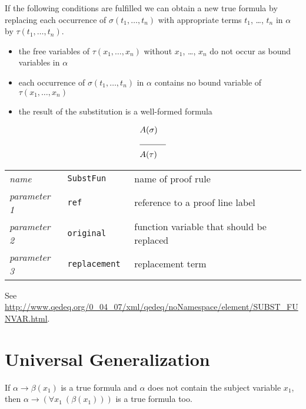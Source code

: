 \documentclass[a4paper,german,10pt,twoside]{book}
\theoremstyle{definition}
\theoremstyle{remark}
\begin{document}
If the following conditions are fulfilled we can obtain a new true formula by replacing each occurrence of $\sigma(t_1, \ldots, t_n)$ with appropriate terms $t_1$, \ldots, $t_n$ in $\alpha$ by $\tau(t_1, \ldots, t_n)$.

\begin{itemize}

\item 
the free variables of $\tau(x_1, \ldots, x_n)$ without $x_1$, \ldots, $x_n$ do not occur as bound variables in $\alpha$

\item
each occurrence of $\sigma(t_1, \ldots, t_n)$ in $\alpha$ contains no bound variable of $\tau(x_1, \ldots, x_n)$

\item
the result of the substitution is a well-formed formula
 
\end{itemize}
        
\par
\begin{eqnarray*}
 & A(\sigma) & \\
 \cline{2-3}
 & A(\tau) & \\
\end{eqnarray*}

\par
\begin{tabularx}{\columnwidth}{lll}
  \emph{name}        & \tt{SubstFun}    & name of proof rule \\
  \emph{parameter 1} & \tt{ref}         & reference to a proof line label \\
  \emph{parameter 2} & \tt{original}    & function variable that should be replaced \\
  \emph{parameter 3} & \tt{replacement} & replacement term 
\end{tabularx}

\par
See \url{http://www.qedeq.org/0_04_07/xml/qedeq/noNamespace/element/SUBST_FUNVAR.html}.

\section{Universal Generalization} \label{chapter6_section7} \hypertarget{chapter6_section7}{}
If $\alpha \rightarrow \beta(x_1)$ is a true formula and $\alpha$ does not contain the subject variable $x_1$, then $\alpha \rightarrow (\forall x_1~(\beta(x_1)))$ is a true formula too.
\end{document}
